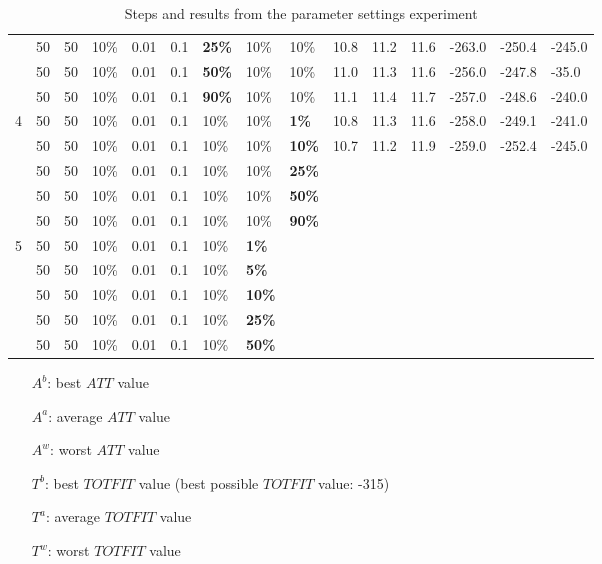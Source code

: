 \begin{table}
\begin{tabular}{|l|l|l|l|l|l|l|l|l||l|l|l|l|l|l|}
    ~ & 50 & 50 & 10\% & 0.01 & 0.1 & \textbf{25\%} & 10\% & 10\% & 10.8 & 11.2 & 11.6 & -263.0 & -250.4 & -245.0 \\
    ~ & 50 & 50 & 10\% & 0.01 & 0.1 & \textbf{50\%} & 10\% & 10\% & 11.0 & 11.3 & 11.6 & -256.0 & -247.8 & -35.0 \\
    ~ & 50 & 50 & 10\% & 0.01 & 0.1 & \textbf{90\%} & 10\% & 10\% & 11.1 & 11.4 & 11.7 & -257.0 & -248.6 & -240.0 \\
    \hline
    4 & 50 & 50 & 10\% & 0.01 & 0.1 & 10\% & 10\% & \textbf{1\%} & 10.8 & 11.3 & 11.6 & -258.0 & -249.1 & -241.0 \\
    ~ & 50 & 50 & 10\% & 0.01 & 0.1 & 10\% & 10\% & \textbf{10\%} & 10.7 & 11.2 & 11.9 & -259.0 & -252.4 & -245.0 \\
    ~ & 50 & 50 & 10\% & 0.01 & 0.1 & 10\% & 10\% & \textbf{25\%} & ~ & ~ & ~ & ~ & ~ & ~ \\
    ~ & 50 & 50 & 10\% & 0.01 & 0.1 & 10\% & 10\% & \textbf{50\%} & ~ & ~ & ~ & ~ & ~ & ~ \\
    ~ & 50 & 50 & 10\% & 0.01 & 0.1 & 10\% & 10\% & \textbf{90\%} & ~ & ~ & ~ & ~ & ~ & ~ \\
    \hline
    5 & 50 & 50 & 10\% & 0.01 & 0.1 & 10\% & \textbf{1\%} & ~ & ~ & ~ & ~ & ~ & ~ & ~ \\
    ~ & 50 & 50 & 10\% & 0.01 & 0.1 & 10\% & \textbf{5\%} & ~ & ~ & ~ & ~ & ~ & ~ & ~ \\
    ~ & 50 & 50 & 10\% & 0.01 & 0.1 & 10\% & \textbf{10\%} & ~ & ~ & ~ & ~ & ~ & ~ & ~ \\
    ~ & 50 & 50 & 10\% & 0.01 & 0.1 & 10\% & \textbf{25\%} & ~ & ~ & ~ & ~ & ~ & ~ & ~ \\
    ~ & 50 & 50 & 10\% & 0.01 & 0.1 & 10\% & \textbf{50\%} & ~ & ~ & ~ & ~ & ~ & ~ & ~ \\
    \hline
    \end{tabular}
    \caption {Steps and results from the parameter settings experiment} 
    \begin{itemize}[noitemsep]
    \item[$A^b$:] best $ATT$ value
    \item[$A^a$:] average $ATT$ value
    \item[$A^w$:] worst $ATT$ value
    \item[$T^b$:] best $TOTFIT$ value (best possible $TOTFIT$ value: -315)
    \item[$T^a$:] average $TOTFIT$ value
    \item[$T^w$:] worst $TOTFIT$ value
    \end{itemize}
    \label{table:parameterSettings}
\end{table}

